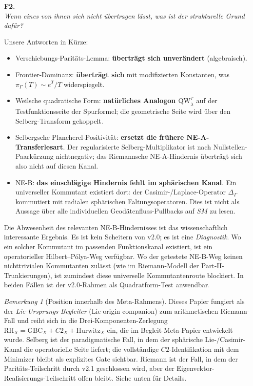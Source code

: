 \documentclass[12pt,a4paper]{article}
\theoremstyle{definition}
\theoremstyle{remark}
\newtheorem{remark}[theorem]{Bemerkung}
\newcommand{\QW}{\mathrm{QW}}
\newcommand{\Delop}{\Delta_{\Gamma}}
\begin{document}
\medskip
\noindent\textbf{F2.}\\
\emph{Wenn eines von ihnen sich nicht übertragen lässt,
was ist der strukturelle Grund dafür?}

\medskip
Unsere Antworten in Kürze:

\begin{itemize}
\item Verschiebungs-Paritäts-Lemma: \textbf{überträgt sich unverändert} (algebraisch).
\item Frontier-Dominanz: \textbf{überträgt sich}
mit modifizierten Konstanten,
was $\pi_\Gamma(T) \sim e^T/T$ widerspiegelt.
\item Weilsche quadratische Form: \textbf{natürliches Analogon $\QW^\Gamma_\lambda$} auf der
Testfunktionsseite der Spurformel; die geometrische Seite wird über den
Selberg-Transform gekoppelt.
\item Selbergsche Plancherel-Positivität: \textbf{ersetzt die frühere
NE-A-Transferlesart}. Der regularisierte Selberg-Multiplikator ist nach
Nullstellen-Paarkürzung nichtnegativ; das Riemannsche NE-A-Hindernis
überträgt sich also nicht auf diesen Kanal.
\item NE-B: \textbf{das einschlägige Hindernis fehlt im sphärischen Kanal}. Ein
universeller Kommutant existiert dort: der Casimir-/Laplace-Operator $\Delop$
kommutiert mit radialen sphärischen Faltungsoperatoren. Dies ist nicht als
Aussage über alle individuellen Geodätenfluss-Pullbacks auf $SM$ zu lesen.
\end{itemize}

Die Abwesenheit des relevanten NE-B-Hindernisses ist das wissenschaftlich
interessante Ergebnis. Es ist kein Scheitern von v2.0; es ist eine
\emph{Diagnostik}. Wo ein solcher Kommutant im passenden Funktionskanal existiert,
ist ein operatorieller Hilbert--Pólya-Weg verfügbar. Wo der getestete
NE-B-Weg keinen nichttrivialen Kommutanten zulässt (wie im Riemann-Modell der
Part-II-Trunkierungen), ist zumindest diese universelle Kommutantenroute
blockiert. In beiden Fällen ist der v2.0-Rahmen als Quadratform-Test
anwendbar.

\begin{remark}[Position innerhalb des Meta-Rahmens]
Dieses Papier fungiert als der \emph{Lie-Ursprungs-Begleiter} (Lie-origin companion) zum arithmetischen
Riemann-Fall \cite{Geiger2026partII} und reiht sich in die Drei-Komponenten-Zerlegung
$\mathrm{RH}_X = \mathrm{GBC}_X + C2_X + \mathrm{Hurwitz}_X$
ein, die im Begleit-Meta-Papier \cite{GeigerMeta2026} entwickelt wurde. Selberg
ist der paradigmatische Fall, in dem der sphärische Lie-/Casimir-Kanal die
operatorielle Seite liefert; die vollständige $C2$-Identifikation mit dem
Minimizer bleibt als explizites Gate sichtbar. Riemann ist der Fall, in dem
der Paritäts-Teilschritt durch v2.1 geschlossen wird, aber der Eigenvektor-Realisierungs-Teilschritt
offen bleibt. Siehe  unten für
Details.
\end{remark}
\end{document}
